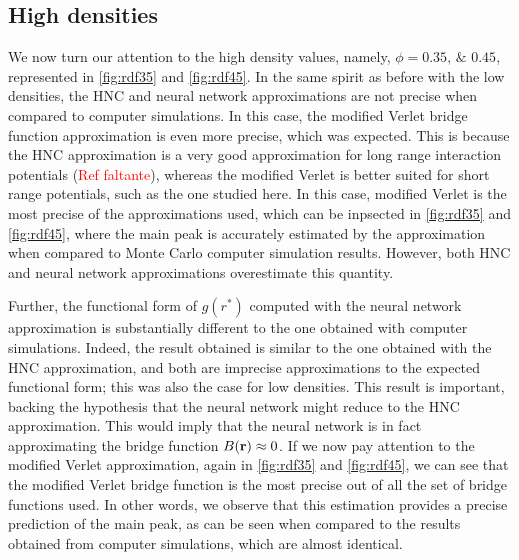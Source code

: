 \subsection{High densities}
We now turn our attention to the high density values, namely,
$\phi=\numlist[list-pair-separator={\enspace\text{and}\enspace}]{0.35; 0.45}$,
represented in \autoref{fig:rdf35} and \ref{fig:rdf45}.
In the same spirit as before with the low densities, the HNC and neural network 
approximations are not precise when compared to computer simulations. In this case,
the modified Verlet bridge function approximation is even more precise, which was expected.
This is because the HNC approximation is a very good approximation for long range
interaction potentials (\textcolor{red}{Ref faltante}), whereas the modified Verlet is 
better suited for short range potentials, such as the one studied here.
In this case, modified Verlet is the most precise of the approximations used, which
can be inpsected in \autoref{fig:rdf35} and \autoref{fig:rdf45}, where the 
main peak is accurately estimated by the approximation when compared to Monte Carlo 
computer simulation results. However, both HNC and neural network approximations 
overestimate this quantity.

Further, the functional form of $g(r^*)$ computed with the neural network approximation 
is substantially different to the one obtained with computer simulations. Indeed, the result
obtained is similar to the one obtained with the HNC approximation, and both are imprecise 
approximations to the expected functional form; this was also the case for low densities.
This result is important, backing the hypothesis that the
neural network might reduce to the HNC approximation.
This would imply that the neural network is in fact approximating the bridge function
$B(\mathbf{r}) \approx 0$. If we now pay attention to the modified Verlet
approximation, again in \autoref{fig:rdf35} and \autoref{fig:rdf45}, 
we can see that the modified Verlet bridge function is the most precise
out of all the set of bridge functions used. In other words, we observe that this
estimation provides a precise prediction of the main peak, as can be seen when compared to 
the results obtained from computer simulations, which are almost identical.

